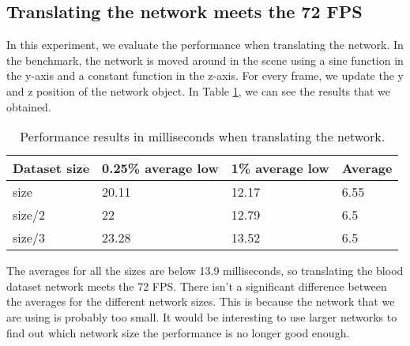 
\subsection{Translating the network meets the 72 FPS}
In this experiment, we evaluate the performance when translating the network. In the benchmark, the network is moved around in the scene using a sine function in the y-axis and a constant function in the z-axis. For every frame, we update the y and z position of the network object. In Table \ref{tab:experiment_moving}, we can see the results that we obtained.

\begin{table}[h!]
\centering
\begin{tabular}{llll}
\hline
Dataset size & 0.25\% average low & 1\% average low & Average \\
\hline
size & 20.11 & 12.17 & 6.55 \\
size/2 & 22  & 12.79 & 6.5 \\
size/3 & 23.28 & 13.52 & 6.5 \\
\end{tabular}
\caption{Performance results in milliseconds when translating the network.}
\label{tab:experiment_moving}
\end{table}

The averages for all the sizes are below 13.9 milliseconds, so translating the blood dataset network meets the 72 FPS. There isn't a significant difference between the averages for the different network sizes. This is because the network that we are using is probably too small. It would be interesting to use larger networks to find out which network size the performance is no longer good enough.


